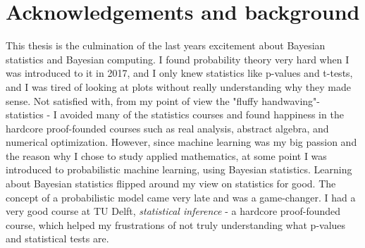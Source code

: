 \section*{Acknowledgements and background}

This thesis is the culmination of the last years excitement about Bayesian statistics and Bayesian
computing. I found probability theory very hard when I was introduced to it in 2017, and I only knew
statistics like p-values and t-tests, and I was tired of looking at plots without really understanding
why they made sense. Not satisfied with, from my point of view the "fluffy handwaving"- statistics - I
avoided many of the statistics courses and found happiness in the hardcore proof-founded courses such as
real analysis, abstract algebra, and numerical optimization. However, since machine learning was my big
passion and the reason why I chose to study applied mathematics, at some point I was introduced to
probabilistic machine learning, using Bayesian statistics. Learning about Bayesian statistics
flipped around my view on statistics for good. The concept of a probabilistic model came very late and
was a game-changer. I had a very good course at TU Delft, \textit{statistical inference} - a hardcore
proof-founded course, which helped my frustrations of not truly understanding what p-values and
statistical tests are.



